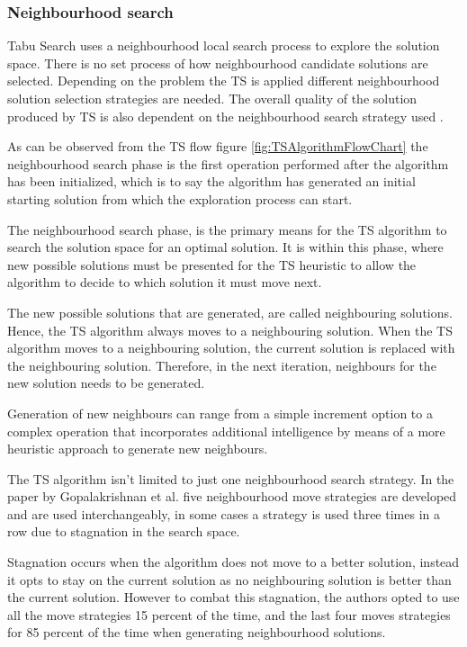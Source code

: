 \subsubsection{Neighbourhood search}
Tabu Search uses a neighbourhood local search process to explore the solution space. There is no set process of how neighbourhood candidate solutions are selected. Depending on the problem the TS is applied different neighbourhood solution selection strategies are needed. The overall quality of the solution produced by TS is also dependent on the neighbourhood search strategy used \cite{TSHazardous}. 

As can be observed from the TS flow figure \ref{fig:TSAlgorithmFlowChart} the neighbourhood search phase is the first operation performed after the algorithm has been initialized, which is to say the algorithm has generated an initial starting solution from which the exploration process can start.

The neighbourhood search phase, is the primary means for the TS algorithm to search the solution space for an optimal solution. It is within this phase, where new possible solutions must be presented for the TS heuristic to allow the algorithm to decide to which solution it must move next.

The new possible solutions that are generated, are called neighbouring solutions. Hence, the TS algorithm always moves to a neighbouring solution. When the TS algorithm moves to a neighbouring solution, the current solution is replaced with the neighbouring solution. Therefore, in the next iteration, neighbours for the new solution needs to be generated.

Generation of new neighbours can range from a simple increment option to a complex operation that incorporates additional intelligence by means of a more heuristic approach to generate new neighbours.

The TS algorithm isn't limited to just one neighbourhood search strategy. In the paper by Gopalakrishnan et al.\cite{TabuCarryOver} five neighbourhood move strategies are developed and are used interchangeably, in some cases a strategy is used three times in a row due to stagnation in the search space. 

Stagnation occurs when the algorithm does not move to a better solution, instead it opts to stay on the current solution as no neighbouring solution is better than the current solution. However to combat this stagnation, the authors opted to use all the move strategies 15 percent of the time, and the last four moves strategies for 85 percent of the time when generating neighbourhood solutions.

